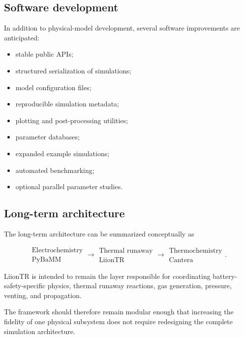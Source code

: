 \subsection{Software development}

In addition to physical-model development, several software improvements
are anticipated:

\begin{itemize}
    \item stable public APIs;
    \item structured serialization of simulations;
    \item model configuration files;
    \item reproducible simulation metadata;
    \item plotting and post-processing utilities;
    \item parameter databases;
    \item expanded example simulations;
    \item automated benchmarking;
    \item optional parallel parameter studies.
\end{itemize}


\subsection{Long-term architecture}

The long-term architecture can be summarized conceptually as

\begin{equation}
    \boxed{
    \begin{array}{c}
        \text{Electrochemistry} \\
        \text{PyBaMM}
    \end{array}
    }
    \longrightarrow
    \boxed{
    \begin{array}{c}
        \text{Thermal runaway} \\
        \text{LiionTR}
    \end{array}
    }
    \longrightarrow
    \boxed{
    \begin{array}{c}
        \text{Thermochemistry} \\
        \text{Cantera}
    \end{array}
    }.
\end{equation}

LiionTR is intended to remain the layer responsible for coordinating
battery-safety-specific physics, thermal runaway reactions, gas
generation, pressure, venting, and propagation.

The framework should therefore remain modular enough that increasing the
fidelity of one physical subsystem does not require redesigning the
complete simulation architecture.